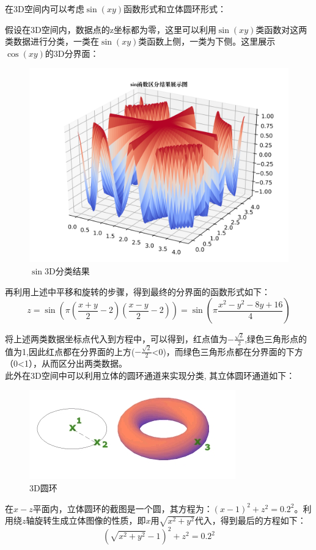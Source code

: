 \documentclass{article}
\newcommand{\hs}{\hspace{2em}}
\begin{document}
{}

\hs 在3D空间内可以考虑$\sin(xy)$函数形式和立体圆环形式：

\hs 假设在3D空间内，数据点的z坐标都为零，这里可以利用$\sin(xy)$类函数对这两类数据进行分类，一类在$\sin(xy)$类函数上侧，一类为下侧。这里展示$\cos(xy)$的3D分界面：
\begin{figure}[htbp]
	\centering
	\includegraphics[width=0.5\linewidth]{img//fig3.png}
	\caption{$\sin$3D分类结果}
\end{figure}

再利用上述中平移和旋转的步骤，得到最终的分界面的函数形式如下：
\begin{equation*}
z = \sin(\pi (\frac{x+y}{2}-2)(\frac{x-y}{2}-2))=\sin(\pi\frac{x^2-y^2-8y+16}{4})
\end{equation*}

将上述两类数据坐标点代入到方程中，可以得到，红点值为$-\frac{\sqrt{2}}{2}$,绿色三角形点的值为1,因此红点都在分界面的上方($-\frac{\sqrt{2}}{2}$<0)，而绿色三角形点都在分界面的下方（0<1），从而区分出两类数据。\\

\hs 此外在3D空间中可以利用立体的圆环通道来实现分类, 其立体圆环通道如下：
\begin{figure}[H]
	\centering
	\includegraphics[width=0.5\linewidth]{img//fig4.jpg}
	\caption{3D圆环}
\end{figure}

在$x-z$平面内，立体圆环的截图是一个圆，其方程为：$(x-1)^2+z^2=0.2^2$。利用绕$z$轴旋转生成立体图像的性质，即$x$用$\sqrt{x^2+y^2}$代入，得到最后的方程如下：
\begin{equation*}
(\sqrt{x^2+y^2}-1)^2+z^2=0.2^2
\end{equation*}
\end{document}
